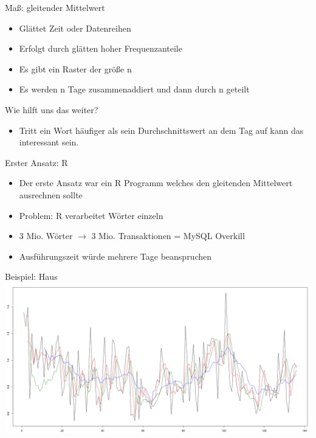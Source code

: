 \documentclass{beamer}
\begin{document}
\begin{frame}{Maß: gleitender Mittelwert}
	\begin{itemize}
		\item Glättet Zeit oder Datenreihen
		\item Erfolgt durch glätten hoher Frequenzanteile
		\item Es gibt ein Raster der größe n		
		\item Es werden n Tage zusammenaddiert und dann durch n geteilt
	\end{itemize}
	
	Wie hilft uns das weiter?
	
	\begin{itemize}
		\item Tritt ein Wort häufiger als sein Durchschnittswert an dem Tag auf kann das interessant sein.
	\end{itemize}		
	
\end{frame}

\begin{frame}{Erster Ansatz: R}
	\begin{itemize}
		\item Der erste Ansatz war ein R Programm welches den gleitenden Mittelwert ausrechnen sollte
		\item Problem: R verarbeitet Wörter einzeln 
		\item 3 Mio. Wörter $\rightarrow$ 3 Mio. Transaktionen = MySQL Overkill
		\item Ausführungszeit würde mehrere Tage beanspruchen
	\end{itemize}
\end{frame}

\begin{frame}{Beispiel: Haus}
\includegraphics[scale=0.18]{Bilder/R.png}
\end{frame}
\end{document}
